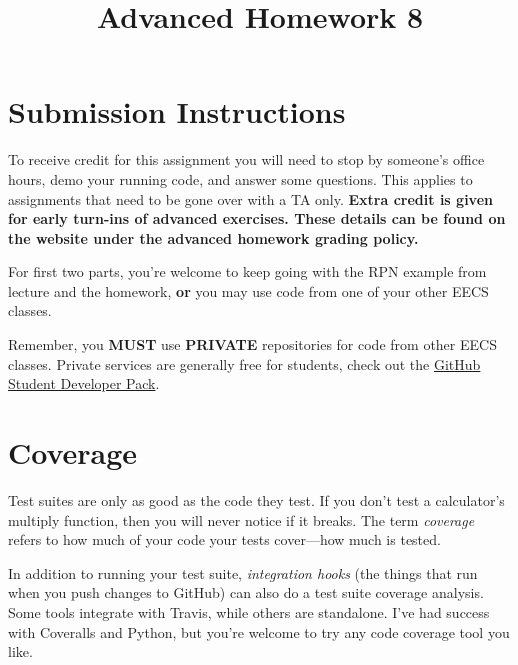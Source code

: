 \documentclass{article}
\begin{document}
\fancyfoot[C]{\color{gray} \thepage~/~\pageref*{LastPage}}
\pagestyle{fancyplain}

\title{\textbf{Advanced Homework 8\\}}
\author{\textbf{\color{red}{Due: Wednesday, March 7th, 11:59PM (Hard Deadline)}}}
\date{}
\maketitle


\section*{Submission Instructions}
To receive credit for this assignment you will need to stop by someone's
office hours, demo your running code, and answer some questions. \textbf{\color{red}{Make sure
to check the office hour schedule as the real due date is at the last office
hours before the date listed above.}} This applies to assignments that need to be gone over with a TA only.
\textbf{Extra credit is given for early turn-ins of advanced exercises. These details can be found on the website under the advanced homework grading policy.}


\begin{mdframed}[innerleftmargin=38pt,innerrightmargin=38pt]\justify
  For first two parts, you're welcome to keep going with the RPN example from
  lecture and the homework, \textbf{or} you may use code from one of your
  other EECS classes.

  {\color{red}Remember, you \textbf{MUST} use \textbf{PRIVATE} repositories
    for code from other EECS classes.} Private services are generally free for
  students, check out the \href{https://education.github.com/pack}{GitHub Student Developer Pack}.
\end{mdframed}

\section{Coverage}

Test suites are only as good as the code they test. If you don't test a
calculator's multiply function, then you will never notice if it breaks. The
term \emph{coverage} refers to how much of your code your tests cover---how
much is tested.

In addition to running your test suite, \emph{integration hooks} (the things
that run when you push changes to GitHub) can also do a test suite coverage
analysis. Some tools integrate with Travis, while others are standalone. I've
had success with Coveralls and Python, but you're welcome to try any code
coverage tool you like.
\end{document}
